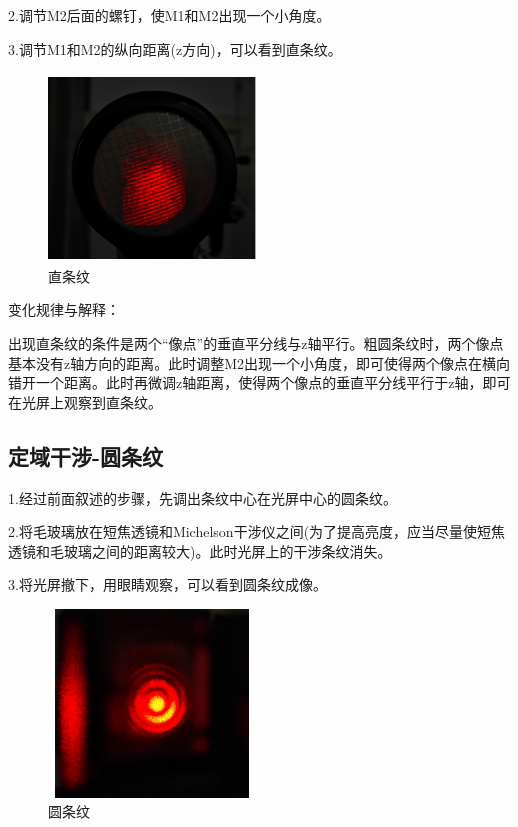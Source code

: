 \documentclass[a4paper, 10pt]{article}
\begin{document}
\noindent 2.调节M2后面的螺钉，使M1和M2出现一个小角度。

\noindent 3.调节M1和M2的纵向距离(z方向)，可以看到直条纹。
\begin{figure}[h]
  \centering 
  \includegraphics[height=5.0cm,width=5.5cm]{p4.png}
  
  \caption{直条纹}
  \label{5}
  
  \end{figure}


\noindent 变化规律与解释：

\noindent 出现直条纹的条件是两个“像点”的垂直平分线与z轴平行。粗圆条纹时，两个像点基本没有z轴方向的距离。此时调整M2出现一个小角度，即可使得两个像点在横向错开一个距离。此时再微调z轴距离，使得两个像点的垂直平分线平行于z轴，即可在光屏上观察到直条纹。

\subsection{定域干涉-圆条纹}
\noindent 1.经过前面叙述的步骤，先调出条纹中心在光屏中心的圆条纹。

\noindent 2.将毛玻璃放在短焦透镜和Michelson干涉仪之间(为了提高亮度，应当尽量使短焦透镜和毛玻璃之间的距离较大)。此时光屏上的干涉条纹消失。

\noindent 3.将光屏撤下，用眼睛观察，可以看到圆条纹成像。


\begin{figure}[h]
  \centering 
  \includegraphics[height=5.0cm,width=5.5cm]{p5.png}
  
  \caption{圆条纹}
  \label{6}

\end{figure}
\end{document}
